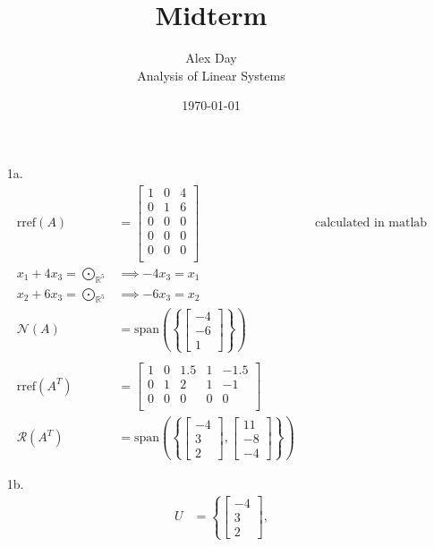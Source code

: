 \documentclass[12pt,fleqn,leqno,letterpaper]{article}
\title{Midterm}
\author{Alex Day\\
	\small{Analysis of Linear Systems}
}
\date{\today}
\begin{document}
\maketitle
	\begin{enumerate}
		\item[1a.]
			\begin{align*}
			  \text{rref}(A) &= \begin{bmatrix}
								1  &  0  &  4\\
								0  &  1  &  6\\
								0  &  0  &  0\\
								0  &  0  &  0\\
								0  &  0  &  0\\
								\end{bmatrix}&&\text{calculated in matlab}\\
			  x_{1} + 4x_{3} = \bigodot_{\mathbb{R}^{5}} &\implies -4x_{3} = x_{1}\\
			  x_{2} + 6x_{3} = \bigodot_{\mathbb{R}^{5}} &\implies -6x_{3} = x_{2}\\
			  \mathcal{N}(A) &= \text{span}\left(\left\{
							    \begin{bmatrix} -4 \\ -6 \\ 1 \end{bmatrix}
								\right\}\right)\\\\
				\text{rref}(A^{T}) &= \begin{bmatrix}
													1 & 0 & 1.5 & 1 & -1.5\\
													0 & 1 & 2 & 1 & -1\\
													0 & 0 & 0 & 0 &  0\\
													\end{bmatrix}\\
			  \mathcal{R}(A^{T}) &= \text{span}\left(\left\{
							    \begin{bmatrix} -4 \\ 3 \\ 2  \end{bmatrix},
							    \begin{bmatrix} 11 \\ -8 \\ -4  \end{bmatrix}
								\right\}\right)
			\end{align*}
	  \item[1b.]
			\begin{align*}
			  U &= \left\{
					\begin{bmatrix} -4 \\ 3 \\ 2  \end{bmatrix},

\end{align*}
\end{enumerate}
\end{document}
